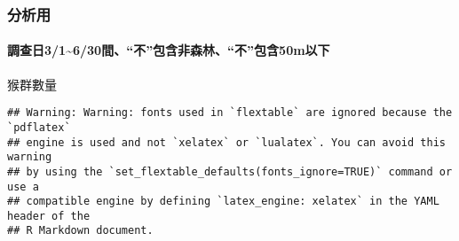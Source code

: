 \documentclass[
]{article}
\begin{document}
\newpage

\hypertarget{ux5206ux6790ux7528}{%
\subsubsection{\texorpdfstring{\textbf{分析用}}{分析用}}\label{ux5206ux6790ux7528}}

\hypertarget{ux8abfux67e5ux65e531630ux9593ux4e0dux5305ux542bux975eux68eeux6797ux4e0dux5305ux542b50mux4ee5ux4e0b}{%
\paragraph{\texorpdfstring{\textbf{調查日3/1\textasciitilde6/30間、``不''包含非森林、``不''包含50m以下}}{調查日3/1\textasciitilde6/30間、``不''包含非森林、``不''包含50m以下}}\label{ux8abfux67e5ux65e531630ux9593ux4e0dux5305ux542bux975eux68eeux6797ux4e0dux5305ux542b50mux4ee5ux4e0b}}

猴群數量

\begin{verbatim}
## Warning: Warning: fonts used in `flextable` are ignored because the `pdflatex`
## engine is used and not `xelatex` or `lualatex`. You can avoid this warning
## by using the `set_flextable_defaults(fonts_ignore=TRUE)` command or use a
## compatible engine by defining `latex_engine: xelatex` in the YAML header of the
## R Markdown document.
\end{verbatim}

\providecommand{\docline}[3]{\noalign{\global\setlength{\arrayrulewidth}{#1}}\arrayrulecolor[HTML]{#2}\cline{#3}}

\setlength{\tabcolsep}{2pt}

\renewcommand*{\arraystretch}{1.5}
\end{document}
